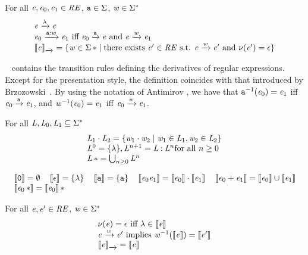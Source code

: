 \begin{definition}
 For all $\re,\re_0,\re_1\in\reSet$, $\sym\in\symAlph$, $\word\in\symAlph^*$
 \[
  \begin{array}{l}
   \re\der{\emptyWord}\re \\
   \re_0\der{\sym\strcons\word}\re_1 \mbox{ iff } \re_0\der{\sym}\re \mbox{ and } \re\der{\word}\re_1
   \\
   \opSem{\re}{\der{}}=\{\word\in\wordUniv \mid \mbox{there exists } \re'\in\reSet \mbox{ s.t. } \re\der{\word}\re' \mbox{ and } \hasEps{\re'}=\eps\}
  \end{array}
 \]
\end{definition}

~ contains the transition rules defining the derivatives of regular expressions.
Except for the presentation style, the definition coincides with that introduced by Brzozowski~\cite{Brzozowski64}. By using the notation of Antimirov \cite{Antimirov96}, we have
that $\sym^{-1}(\re_0)=\re_1$ iff $\re_0\der{\sym}\re_1$, and $\word^{-1}(\re_0)=\re_1$ iff $\re_0\der{\word}\re_1$.


\begin{definition}\label{def:langOp}
 For all $\lang,\lang_0,\lang_1\subseteq\symAlph^*$
 \[
  \begin{array}{l}
   \lang_1\strcatop\lang_2=\{\word_1\strcatop\word_2\mid \word_1\in\lang_1,\word_2\in\lang_2\} \\
   \lang^0=\{\emptyWord\}, \lang^{n+1}=\lang\strcons\lang^n \mbox{for all $n\geq 0$}           \\
   \starop{\lang} = \bigcup_{n\geq 0}\lang^n
  \end{array}
 \]
\end{definition}
\begin{definition}\label{def:sem}
 \[
  \begin{array}{l}
   \sem{\none}=\emptyset\quad \sem{\eps}=\{\emptyWord\} \quad \sem{\sym}=\{\sym\} \quad
   \sem{\re_0\catop\re_1}=\sem{\re_0}\strcatop\sem{\re_1} \quad \sem{\re_0\orop\re_1}=\sem{\re_0}\cup\sem{\re_1} \\ \sem{\starop{\re_0}}=\starop{\sem{\re_0}}
  \end{array}
 \]
\end{definition}

\begin{theorem}[theorem]\label{theo:der}
 For all $\re,\re'\in\reSet$, $\word\in\symAlph^*$
 \[
  \begin{array}{l}
   \hasEps{\re} = \eps \mbox{ iff } \emptyWord\in\sem{\re}              \\
   \re\der{\word}\re' \mbox{ implies } \word^{-1}(\sem{\re})=\sem{\re'} \\
   \opSem{\re}{\der{}}=\sem{\re}
  \end{array}
 \]
\end{theorem}

